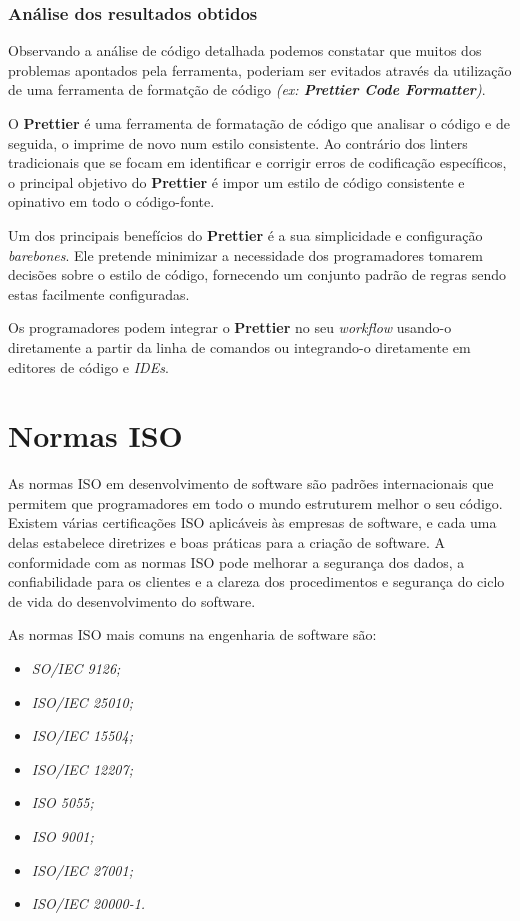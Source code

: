 \documentclass[a4paper,12pt]{article} %
\begin{document}
\newpage
\subsubsection{Análise dos resultados obtidos}
Observando a análise de código detalhada podemos constatar que muitos dos problemas apontados pela ferramenta, poderiam ser evitados através da utilização de uma ferramenta de formatção de código \textit{(ex: \textbf{Prettier Code Formatter})}.

\hfill

O \textbf{Prettier} é uma ferramenta de formatação de código que analisar o código e de seguida, o imprime de novo num estilo consistente. Ao contrário dos linters tradicionais que se focam em identificar e corrigir erros de codificação específicos, o principal objetivo do \textbf{Prettier} é impor um estilo de código consistente e opinativo em todo o código-fonte.

Um dos principais benefícios do \textbf{Prettier} é a sua simplicidade e configuração \textit{barebones}. Ele pretende minimizar a necessidade dos programadores tomarem decisões sobre o estilo de código, fornecendo um conjunto padrão de regras sendo estas facilmente configuradas.

Os programadores podem integrar o \textbf{Prettier} no seu \textit{workflow} usando-o diretamente a partir da linha de comandos ou integrando-o diretamente em editores de código e \textit{IDEs}.

\newpage
\section{Normas ISO}
As normas ISO em desenvolvimento de software são padrões internacionais que permitem que programadores em todo o mundo estruturem melhor o seu código. Existem várias certificações ISO aplicáveis às empresas de software, e cada uma delas estabelece diretrizes e boas práticas para a criação de software. A conformidade com as normas ISO pode melhorar a segurança dos dados, a confiabilidade para os clientes e a clareza dos procedimentos e segurança do ciclo de vida do desenvolvimento do software.

As normas ISO mais comuns na engenharia de software são:
\begin{itemize}
	\item \textit{SO/IEC 9126;}
	\item \textit{ISO/IEC 25010;}
	\item \textit{ISO/IEC 15504;}
	\item \textit{ISO/IEC 12207;}
	\item \textit{ISO 5055;}
	\item \textit{ISO 9001;}
	\item \textit{ISO/IEC 27001;}
	\item \textit{ISO/IEC 20000-1.}
\end{itemize}
\end{document}
